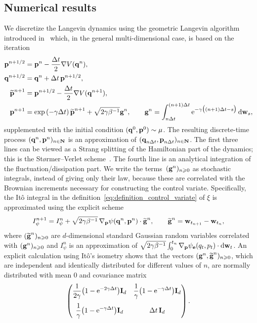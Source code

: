 \documentclass[11pt,a4paper]{article}
\begin{document}
\subsection{Numerical results}%
\label{sub:numerical_results}
We discretize the Langevin dynamics using the geometric Langevin algorithm introduced in~\cite{MR2608370} which,
in the general multi-dimensional case, is based on the iteration
\begin{align*}
    \boldsymbol{\mathbf p}^{n+1/2}
    &= \boldsymbol{\mathbf p}^n - \frac{\Delta t}{2} \nabla V(\boldsymbol{\mathbf q}^n), \\
    \boldsymbol{\mathbf q}^{n+1/2}
    &= \boldsymbol{\mathbf q}^n + \Delta t \, \boldsymbol{\mathbf p}^{n+1/2}, \\
    \widetilde {\boldsymbol{\mathbf p}}^{n+1}
    &= \boldsymbol{\mathbf p}^{n+1/2} - \frac{\Delta t}{2} \nabla V(\boldsymbol{\mathbf q}^{n+1}), \\
    \boldsymbol{\mathbf p}^{n+1} &= \exp \left(- \gamma \Delta t \right) \widetilde {\boldsymbol{\mathbf p}}^{n+1}
    + \sqrt{2 \gamma \beta^{-1}} \boldsymbol{\mathbf g}^n, \qquad \boldsymbol{\mathbf g}^n = \int_{n \Delta t}^{(n+1)\Delta t} \mathrm{e}^{-\gamma \bigl((n+1)\Delta t-s\bigr)} \, \mathrm d \boldsymbol{\mathbf w}_s,
\end{align*}
supplemented with the initial condition $(\boldsymbol{\mathbf q}^0, \boldsymbol{\mathbf p}^0) \sim \mu$.
The resulting discrete-time process $(\boldsymbol{\mathbf q}^n, \boldsymbol{\mathbf p}^n)_{n \in \mathbf N}$ is an approximation of $(\boldsymbol{\mathbf q}_{n \Delta t}, \boldsymbol{\mathbf p}_{n \Delta t})_{n \in \mathbf N}$.
The first three lines can be viewed as a Strang splitting of the Hamiltonian part of the dynamics;
this is the St\o rmer--Verlet scheme~\cite{verlet1967computer}.
The fourth line is an analytical integration of the fluctuation/dissipation part.
We write the terms~$(\boldsymbol{\mathbf g}^n)_{n\geqslant0}$ as stochastic integrals, instead of giving only their law,
because these are correlated with the Brownian increments necessary for constructing the control variate.
Specifically, the It\^o integral in the definition~\eqref{eq:definition_control_variate} of $\xi$ is approximated using the explicit scheme
\[
    I_{\psi}^{n+1} = I_{\psi}^n + \sqrt{2 \gamma \beta^{-1}} \, \nabla_{\boldsymbol{\mathbf p}} \psi(\boldsymbol{\mathbf q}^{n}, \boldsymbol{\mathbf p}^{n}) \cdot
    \widetilde {\boldsymbol{\mathbf g}}^n, \qquad \widetilde {\boldsymbol{\mathbf g}}^n = \boldsymbol{\mathbf w}_{t_{n+1}} - \boldsymbol{\mathbf w}_{t_n},
\]
where $(\widetilde {\boldsymbol{\mathbf g}}^n)_{n \geqslant 0}$ are $d$-dimensional standard Gaussian random variables correlated with $(\boldsymbol{\mathbf g}^n)_{n \geqslant 0}$
and $I_{\psi}^{n}$ is an approximation of $\sqrt{2 \gamma \beta^{-1}} \int_{0}^{t_n} \nabla_{\boldsymbol{\mathbf p}} \psi_{\boldsymbol{\mathbf e}}(q_t, p_t) \cdot \mathrm d \boldsymbol{\mathbf w}_t$.
An explicit calculation using It\^o's isometry shows that the vectors $(\boldsymbol{\mathbf g}^n, \widetilde {\boldsymbol{\mathbf g}}^n)_{n \geqslant 0}$,
which are independent and identically distributed for different values of $n$,
are normally distributed with mean 0 and covariance matrix
\[
    \begin{pmatrix}
        \displaystyle \frac{1}{2 \gamma} \bigl(1 - \mathrm{e}^{-2 \gamma \Delta t}\bigr) \boldsymbol{\mathbf I}_d
        & \displaystyle \frac{1}{\gamma}\bigl(1 - \mathrm{e}^{-\gamma \Delta t}\bigr) \boldsymbol{\mathbf I}_d \\[.4cm]
        \displaystyle  \frac{1}{\gamma}\bigl(1 - \mathrm{e}^{-\gamma \Delta t}\bigr) \boldsymbol{\mathbf I}_d
        & \displaystyle \Delta t \, \boldsymbol{\mathbf I}_d
    \end{pmatrix}.
\]
\end{document}
